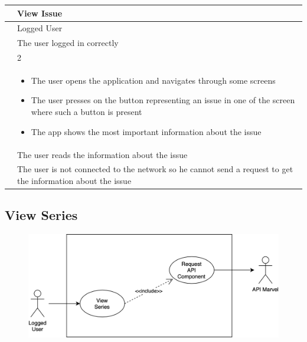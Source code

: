 {{{{\renewcommand{\arraystretch}{2}
{\begin{center}
\begin{tabular}{ | m{4cm} | m{9cm} | } 
 \hline
 {\centering{\textbf{Name}}} & View Issue \\
 \hline
 {\centering{\textbf{Actor}}} & Logged User \\
 \hline
 {\centering{\textbf{Entry Condition}}} & The user logged in correctly \\
 \hline
 {\centering{\textbf{Goal}}} & 2 \\
 \hline
 {\centering{\textbf{Event flow}}} & \begin{itemize}[leftmargin=*]
 	\item The user opens the application and navigates through some screens
	\item The user presses on the button representing an issue in one of the screen where such a button is present
	\item The app shows the most important information about the issue
	\end{itemize} \\	
 \hline
 {\centering{\textbf{Exit condition}}} & The user reads the information about the issue \\
 \hline
 {\centering{\textbf{Exceptions}}} & The user is not connected to the network so he cannot send a request to get the information about the issue \\
 \hline
\end{tabular}
\end{center}}

\clearpage

\subsection{View Series}
\begin{figure}[h]
\centering
\includegraphics[width=\textwidth]{img/usecases/viewseries}
\end{figure}

}}}}
